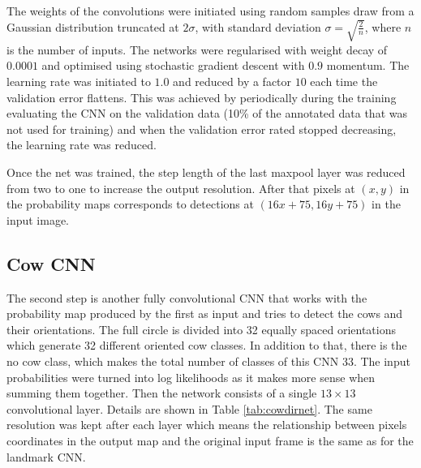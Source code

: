 \documentclass{cta-author}
\begin{document}
The weights of the convolutions were initiated using random samples draw from a Gaussian
distribution truncated at $2\sigma$, with standard deviation $\sigma=\sqrt{\frac{2}{n}}$,
where $n$ is the number of inputs\cite{DBLP:journals/corr/HeZR015}. The networks were regularised with weight
decay of
$0.0001$ and optimised using stochastic gradient descent with $0.9$ momentum. The
learning rate was initiated to $1.0$ and reduced by a factor $10$ each time the validation
error flattens. This was achieved by periodically during the training evaluating the CNN on the validation data
(10\% of the annotated data that was not used for training) and when the validation error rated stopped decreasing,
the learning rate was reduced.

Once the net was trained, the step length of the last maxpool layer was reduced from two to one to increase
the output resolution. After that pixels at $\left(x, y\right)$ in the probability maps corresponds to
detections at $\left(16 x + 75, 16 y + 75\right)$ in the input image.

\subsection{Cow CNN}

The second step is another fully convolutional CNN that works with the probability map produced by the first
as input and tries to detect the cows and their orientations. The full circle is divided into 32 equally
spaced orientations which generate 32 different oriented cow classes. In addition to that, there is the no
cow class, which makes the total number of classes of this CNN 33. The input probabilities were turned into
log likelihoods as it makes more sense when summing them together. Then the network consists of a single $ 13
\times 13 $ convolutional layer. Details are shown in Table \ref{tab:cowdirnet}. The same resolution was kept
after each layer which means the relationship between pixels coordinates in the output map and the original
input frame is the same as for the landmark CNN.
\end{document}
